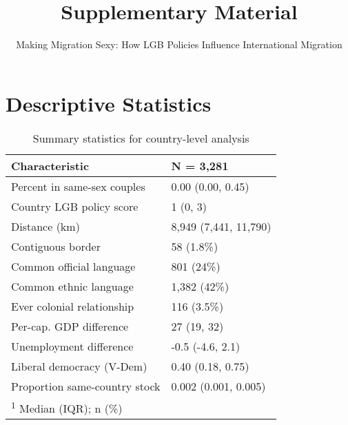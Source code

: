 \documentclass[
  11pt,
]{article}
\title{Supplementary Material}
\subtitle{Making Migration Sexy: How LGB Policies Influence International Migration}
\author{}
\date{\vspace{-2.5em}}
\begin{document}
\maketitle

{
\hypersetup{linkcolor=}
\setcounter{tocdepth}{2}
\tableofcontents
}
\hypertarget{appendix-appendix}{%
\appendix}


\hypertarget{descriptive-statistics}{%
\section{Descriptive Statistics}\label{descriptive-statistics}}

\begin{table}[!h]

\caption{\label{tab:desc-table-country}Summary statistics for country-level analysis}
\centering
\fontsize{8}{10}\selectfont
\begin{tabular}[t]{ll}
\toprule
Characteristic & N = 3,281\\
\midrule
Percent in same-sex couples & 0.00 (0.00, 0.45)\\
Country LGB policy score & 1 (0, 3)\\
Distance (km) & 8,949 (7,441, 11,790)\\
Contiguous border & 58 (1.8\%)\\
Common official language & 801 (24\%)\\
\addlinespace
Common ethnic language & 1,382 (42\%)\\
Ever colonial relationship & 116 (3.5\%)\\
Per-cap. GDP difference & 27 (19, 32)\\
Unemployment difference & -0.5 (-4.6, 2.1)\\
Liberal democracy (V-Dem) & 0.40 (0.18, 0.75)\\
\addlinespace
Proportion same-country stock & 0.002 (0.001, 0.005)\\
\bottomrule
\multicolumn{2}{l}{\rule{0pt}{1em}\textsuperscript{1} Median (IQR); n (\%)}\\
\end{tabular}
\end{table}
\end{document}
